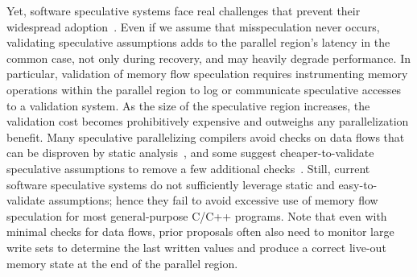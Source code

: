 Yet, software speculative systems face real challenges that prevent their
widespread adoption~\cite{cascaval:08:stmtoy:short, .., ..}.
Even if we assume that misspeculation never occurs, validating speculative
assumptions adds to the parallel region's latency in the common case, not only
during recovery, and may heavily degrade performance.
%
In particular, validation of memory flow speculation requires instrumenting
memory operations within the parallel region to log or communicate speculative
accesses to a validation system. As the size of the speculative region
increases, the validation cost becomes prohibitively expensive and outweighs any
parallelization benefit.
%
Many speculative parallelizing compilers avoid checks on data flows that can be
disproven by static analysis~\cite{stmlite, LRPD,..}, and some suggest
cheaper-to-validate speculative assumptions to remove a few additional
checks~\cite{privateer, ..}.
%
Still, current software speculative systems do not sufficiently leverage static
and easy-to-validate assumptions; hence they fail to avoid excessive use of
memory flow speculation for most general-purpose C/C++ programs.
%
Note that even with minimal checks for data flows, prior proposals often also
need to monitor large write sets to determine the last written values and
produce a correct live-out memory state at the end of the parallel region.

%
%

